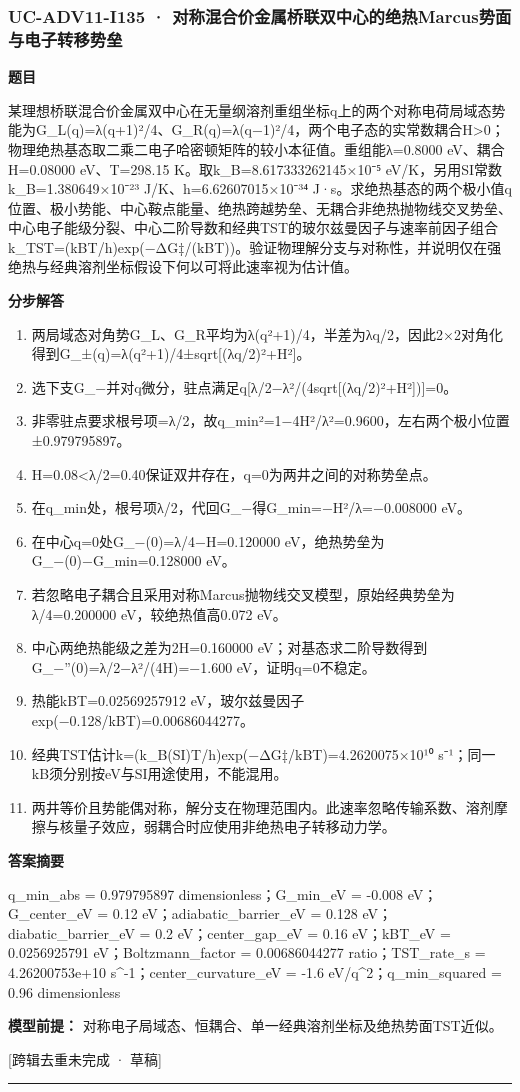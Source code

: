 \documentclass[UTF8,11pt,a4paper]{ctexart}
\begin{document}
\subsubsection*{UC-ADV11-I135 · 对称混合价金属桥联双中心的绝热Marcus势面与电子转移势垒}
\noindent\textbf{题目}\par
某理想桥联混合价金属双中心在无量纲溶剂重组坐标q上的两个对称电荷局域态势能为G\_L(q)=λ(q+1)²/4、G\_R(q)=λ(q−1)²/4，两个电子态的实常数耦合H>0；物理绝热基态取二乘二电子哈密顿矩阵的较小本征值。重组能λ=0.8000 eV、耦合H=0.08000 eV、T=298.15 K。取k\_B=8.617333262145×10⁻⁵ eV/K，另用SI常数k\_B=1.380649×10⁻²³ J/K、h=6.62607015×10⁻³⁴ J·s。求绝热基态的两个极小值q位置、极小势能、中心鞍点能量、绝热跨越势垒、无耦合非绝热抛物线交叉势垒、中心电子能级分裂、中心二阶导数和经典TST的玻尔兹曼因子与速率前因子组合k\_TST=(kBT/h)exp(−ΔG‡/(kBT))。验证物理解分支与对称性，并说明仅在强绝热与经典溶剂坐标假设下何以可将此速率视为估计值。\par
\medskip\noindent\textbf{分步解答}
\begin{enumerate}
\item 两局域态对角势G\_L、G\_R平均为λ(q²+1)/4，半差为λq/2，因此2×2对角化得到G\_±(q)=λ(q²+1)/4±sqrt[(λq/2)²+H²]。
\item 选下支G\_−并对q微分，驻点满足q[λ/2−λ²/(4sqrt[(λq/2)²+H²])]=0。
\item 非零驻点要求根号项=λ/2，故q\_min²=1−4H²/λ²=0.9600，左右两个极小位置±0.979795897。
\item H=0.08<λ/2=0.40保证双井存在，q=0为两井之间的对称势垒点。
\item 在q\_min处，根号项λ/2，代回G\_−得G\_min=−H²/λ=−0.008000 eV。
\item 在中心q=0处G\_−(0)=λ/4−H=0.120000 eV，绝热势垒为G\_−(0)−G\_min=0.128000 eV。
\item 若忽略电子耦合且采用对称Marcus抛物线交叉模型，原始经典势垒为λ/4=0.200000 eV，较绝热值高0.072 eV。
\item 中心两绝热能级之差为2H=0.160000 eV；对基态求二阶导数得到G\_−''(0)=λ/2−λ²/(4H)=−1.600 eV，证明q=0不稳定。
\item 热能kBT=0.02569257912 eV，玻尔兹曼因子exp(−0.128/kBT)=0.00686044277。
\item 经典TST估计k=(k\_B(SI)T/h)exp(−ΔG‡/kBT)=4.2620075×10¹⁰ s⁻¹；同一kB须分别按eV与SI用途使用，不能混用。
\item 两井等价且势能偶对称，解分支在物理范围内。此速率忽略传输系数、溶剂摩擦与核量子效应，弱耦合时应使用非绝热电子转移动力学。
\end{enumerate}
\noindent\textbf{答案摘要}\par
q\_min\_abs = 0.979795897 dimensionless；G\_min\_eV = -0.008 eV；G\_center\_eV = 0.12 eV；adiabatic\_barrier\_eV = 0.128 eV；diabatic\_barrier\_eV = 0.2 eV；center\_gap\_eV = 0.16 eV；kBT\_eV = 0.0256925791 eV；Boltzmann\_factor = 0.00686044277 ratio；TST\_rate\_s = 4.26200753e+10 s\textasciicircum{}-1；center\_curvature\_eV = -1.6 eV/q\textasciicircum{}2；q\_min\_squared = 0.96 dimensionless\par
\noindent\textbf{模型前提：}
对称电子局域态、恒耦合、单一经典溶剂坐标及绝热势面TST近似。\par
\noindent\textcolor{red!65!black}{[跨辑去重未完成 · 草稿]} \par
\medskip\hrule\medskip
{}
\end{document}

